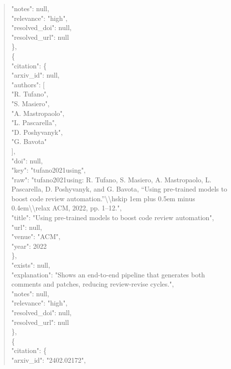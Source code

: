 \documentclass[11pt]{article}
\begin{document}
\begin{quote}
      "notes": null,\\
      "relevance": "high",\\
      "resolved\_doi": null,\\
      "resolved\_url": null\\
    \},\\
    \{\\
      "citation": \{\\
        "arxiv\_id": null,\\
        "authors": [\\
          "R. Tufano",\\
          "S. Masiero",\\
          "A. Mastropaolo",\\
          "L. Pascarella",\\
          "D. Poshyvanyk",\\
          "G. Bavota"\\
        ],\\
        "doi": null,\\
        "key": "tufano2021using",\\
        "raw": "tufano2021using: R. Tufano, S. Masiero, A. Mastropaolo, L. Pascarella, D. Poshyvanyk, and G. Bavota, ``Using pre-trained models to boost code review automation.''\textbackslash{}\textbackslash{}hskip 1em plus 0.5em minus 0.4em\textbackslash{}\textbackslash{}relax ACM, 2022, pp. 1--12.",\\
        "title": "Using pre-trained models to boost code review automation",\\
        "url": null,\\
        "venue": "ACM",\\
        "year": 2022\\
      \},\\
      "exists": null,\\
      "explanation": "Shows an end-to-end pipeline that generates both comments and patches, reducing review-revise cycles.",\\
      "notes": null,\\
      "relevance": "high",\\
      "resolved\_doi": null,\\
      "resolved\_url": null\\
    \},\\
    \{\\
      "citation": \{\\
        "arxiv\_id": "2402.02172",\\

\end{quote}
\end{document}
